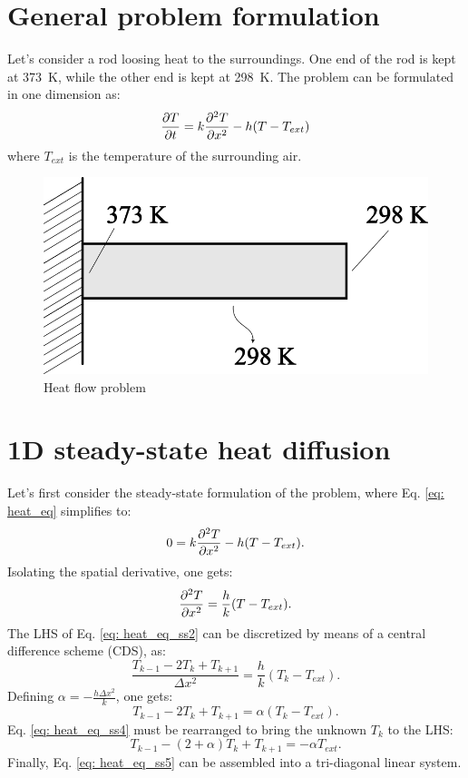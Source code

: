 \documentclass{article}
\begin{document}
\section*{General problem formulation}


Let's consider a rod loosing heat to the surroundings. One end of the rod is kept at \SI{373}{\kelvin}, while the other end is kept at \SI{298}{\kelvin}. The problem can be formulated in one dimension as:
\begin{equation}\label{eq: heat_eq}
	\pdv{T}{t} = k\pdv[2]{T}{x} - h(T-T_{ext})
\end{equation}
where $ T_{ext} $ is the temperature of the surrounding air.

\begin{figure}[ht!]
	\centering
	\includegraphics[width=0.5\linewidth]{figs/rod}
	\caption{Heat flow problem}
	\label{fig:rod}
\end{figure}

\section*{1D steady-state heat diffusion}
Let's first consider the steady-state formulation of the problem, where Eq. \ref{eq: heat_eq} simplifies to:
\begin{equation}\label{eq: heat_eq_ss1}
	0 = k\pdv[2]{T}{x} - h(T-T_{ext}).
\end{equation}
Isolating the spatial derivative, one gets:
\begin{equation}\label{eq: heat_eq_ss2}
	\pdv[2]{T}{x} = \frac{h}{k}(T-T_{ext}).
\end{equation}
The LHS of Eq. \ref{eq: heat_eq_ss2} can be discretized by means of a central difference scheme (CDS), as:
\begin{equation}\label{eq: heat_eq_ss3}
	\frac{T_{k-1}-2T_{k}+T_{k+1}}{\Delta x^2} =  \frac{h}{k}(T_k-T_{ext}).
\end{equation}
Defining $ \alpha =  -\frac{h \Delta x^2}{k} $, one gets:
\begin{equation}\label{eq: heat_eq_ss4}
	T_{k-1}-2T_{k}+T_{k+1} = \alpha (T_k-T_{ext}).
\end{equation}
Eq. \ref{eq: heat_eq_ss4} must be rearranged to bring the unknown $ T_k $ to the LHS:
\begin{equation}\label{eq: heat_eq_ss5}
	T_{k-1}-(2+\alpha)T_{k}+T_{k+1} = -\alpha T_{ext}.
\end{equation}
Finally, Eq. \ref{eq: heat_eq_ss5} can be assembled into a tri-diagonal linear system.
\end{document}
